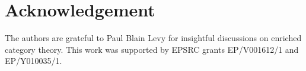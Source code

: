 \section*{Acknowledgement}
The authors are grateful to Paul Blain Levy for insightful discussions on enriched category theory.
This work was supported by EPSRC grants EP/V001612/1 and EP/Y010035/1.
